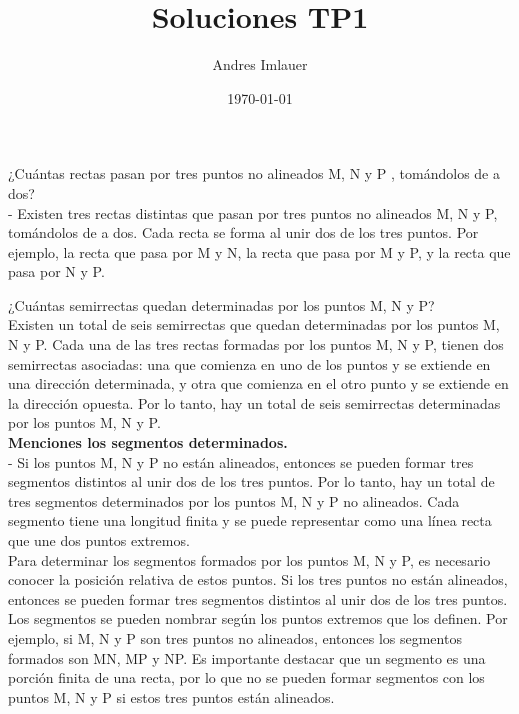\documentclass{article}
\title{Soluciones TP1}
\author{Andres Imlauer}
\date{\today}
\begin{document}
\maketitle
\thispagestyle{empty} %


¿Cuántas rectas pasan por tres puntos no alineados M, N y P , tomándolos de a dos? \\
- Existen tres rectas distintas que pasan por tres puntos no alineados M, N y P, tomándolos de a dos. Cada recta se forma al unir dos de los tres puntos. Por ejemplo, la recta que pasa por M y N, la recta que pasa por M y P, y la recta que pasa por N y P.

¿Cuántas semirrectas quedan determinadas por los puntos M, N y P? \\
Existen un total de seis semirrectas que quedan determinadas por los puntos M, N y P. Cada una de las tres rectas formadas por los puntos M, N y P, tienen dos semirrectas asociadas: una que comienza en uno de los puntos y se extiende en una dirección determinada, y otra que comienza en el otro punto y se extiende en la dirección opuesta. Por lo tanto, hay un total de seis semirrectas determinadas por los puntos M, N y P.\\




{\bf Menciones los segmentos determinados.} \\
- Si los puntos M, N y P no están alineados, entonces se pueden formar tres segmentos distintos al unir dos de los tres puntos. Por lo tanto, hay un total de tres segmentos determinados por los puntos M, N y P no alineados. Cada segmento tiene una longitud finita y se puede representar como una línea recta que une dos puntos extremos. \\
Para determinar los segmentos formados por los puntos M, N y P, es necesario conocer la posición relativa de estos puntos. Si los tres puntos no están alineados, entonces se pueden formar tres segmentos distintos al unir dos de los tres puntos. Los segmentos se pueden nombrar según los puntos extremos que los definen. Por ejemplo, si M, N y P son tres puntos no alineados, entonces los segmentos formados son MN, MP y NP. Es importante destacar que un segmento es una porción finita de una recta, por lo que no se pueden formar segmentos con los puntos M, N y P si estos tres puntos están alineados. \\
\end{document}
